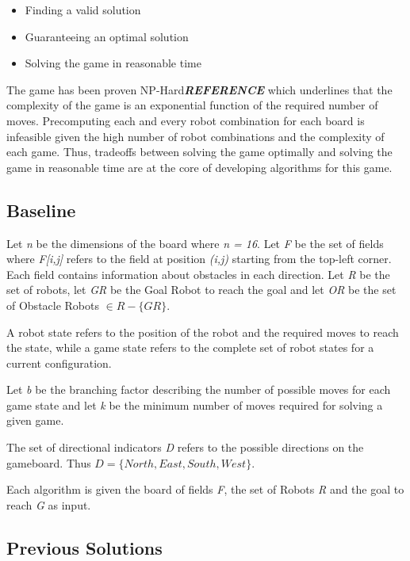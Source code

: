 \documentclass[]{article}
\providecommand{\tightlist}{%
  \setlength{\itemsep}{0pt}\setlength{\parskip}{0pt}}
\begin{document}
\begin{itemize}
\tightlist
\item
  Finding a valid solution
\item
  Guaranteeing an optimal solution
\item
  Solving the game in reasonable time
\end{itemize}

The game has been proven NP-Hard\textbf{\emph{REFERENCE}} which
underlines that the complexity of the game is an exponential function of
the required number of moves. Precomputing each and every robot
combination for each board is infeasible given the high number of robot
combinations and the complexity of each game. Thus, tradeoffs between
solving the game optimally and solving the game in reasonable time are
at the core of developing algorithms for this game.

\subsection{Baseline}\label{baseline}

Let \emph{n} be the dimensions of the board where \emph{n = 16}. Let
\emph{F} be the set of fields where \emph{F{[}i,j{]}} refers to the
field at position \emph{(i,j)} starting from the top-left corner. Each
field contains information about obstacles in each direction. Let
\emph{R} be the set of robots, let \emph{GR} be the Goal Robot to reach
the goal and let \emph{OR} be the set of Obstacle Robots
\(\in R - \{GR\}\).

A robot state refers to the position of the robot and the required moves
to reach the state, while a game state refers to the complete set of
robot states for a current configuration.

Let \emph{b} be the branching factor describing the number of possible
moves for each game state and let \emph{k} be the minimum number of
moves required for solving a given game.

The set of directional indicators \emph{D} refers to the possible
directions on the gameboard. Thus
\(D = \{ North, East, South, West \}\).

Each algorithm is given the board of fields \emph{F}, the set of Robots
\emph{R} and the goal to reach \emph{G} as input.

\subsection{Previous Solutions}\label{previous-solutions}
\end{document}
